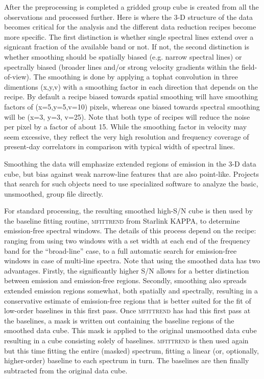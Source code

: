 \documentclass[final,authoryear,5p,times,twocolumn]{elsarticle}
\begin{document}
After the preprocessing is completed a gridded group cube is created
from all the observations and processed further. Here is where the 3-D
structure of the data becomes critical for the analysis and the
different data reduction recipes become more specific. The first
distinction is whether single spectral lines extend over a signicant
fraction of the available band or not. If not, the second distinction
is whether smoothing should be spatially biased (e.g. narrow spectral
lines) or spectrally biased (broader lines and/or strong velocity
gradients within the field-of-view). The smoothing is done by applying
a tophat convolution in three dimentions (x,y,v) with a smoothing
factor in each direction that depends on the recipe.  By default a
recipe biased towards spatial smoothing will have smoothing factors of
(x=5,y=5,v=10) pixels, whereas one biased towards spectral smoothing
will be (x=3, y=3, v=25). Note that both type of recipes will reduce
the noise per pixel by a factor of about 15. While the smoothing
factor in velocity may seem excessive, they reflect the very high
resolution and frequency coverage of present-day correlators in
comparison with typical width of spectral lines.

Smoothing the data will emphasize extended regions of emission in the
3-D data cube, but bias against weak narrow-line features that are also
point-like. Projects that search for such objects need to use specialized
software to analyze the basic, unsmoothed, group file directly.

For standard processing, the resulting smoothed high-S/N cube 
is then used by the baseline  fitting routine, \textsc{mfittrend} from Starlink KAPPA, to determine
emission-free spectral windows. 
The details of this process depend on the recipe: ranging from using two 
windows with a set width at each end of the frequency band 
for the ``broad-line'' case,  to a full automatic search for emission-free
windows in case of multi-line spectra. Note that using the smoothed data has
two advantages. Firstly, the significantly higher S/N  allows for a better 
distinction between emission and emission-free regions. Secondly, smoothing
also spreads extended emission regions somewhat, both spatially and spectrally, 
resulting in a conservative estimate of emission-free regions that is better suited for
the fit of low-order baselines in this first  pass. Once \textsc{mfittrend} has
had this first pass at the baselines,  a mask is written out containing the
baseline  regions of the smoothed data cube. This mask is applied to the original
unsmoothed data cube resulting in a cube consisting solely of
baselines. \textsc{mfittrend} is then used again but this time fitting
the entire (masked) spectrum, fitting a linear (or, optionally, higher-order) baseline 
to each spectrum in turn. The baselines are then finally subtracted from the
original data cube.
\end{document}
